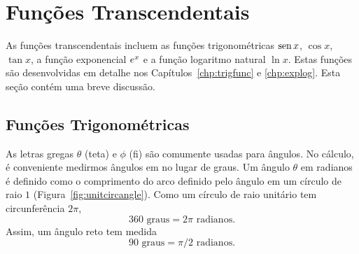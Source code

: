 \begin{sectionproblems}





\end{sectionproblems}

\section{Funções Transcendentais}
\label{sec:transcfunc}

As funções transcendentais incluem as funções trigonométricas $\operatorname{sen} x$,
$\cos x$, $\tan x$, a função exponencial $e^x$ e a função logaritmo
natural $\ln x$. Estas funções são desenvolvidas em detalhe nos
Capítulos~\ref{chp:trigfunc} e \ref{chp:explog}. Esta seção contém uma
breve discussão.

\subsection{Funções Trigonométricas}

As letras gregas $\theta$ (teta) e $\phi$ (fi) são comumente usadas para
ângulos. No cálculo, é conveniente medirmos ângulos em  no
lugar de graus. Um ângulo $\theta$ em radianos é definido como o comprimento
do arco definido pelo ângulo em um círculo de raio $1$
(Figura~\ref{fig:unitcircangle}). Como um círculo de raio unitário tem
circunferência $2\pi$,
$$
  360 \text{ graus} = 2\pi \text{ radianos}.
$$
Assim, um ângulo reto tem medida
$$
  90 \text{ graus} = \pi/2 \text{ radianos}.
$$

